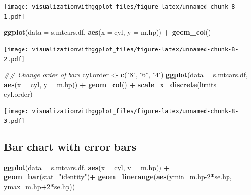 \documentclass[]{krantz}
\makeatletter
\newenvironment{Shaded}{\begin{snugshade}}{\end{snugshade}}
\newcommand{\CommentTok}[1]{\textcolor[rgb]{0.56,0.35,0.01}{\textit{#1}}}
\newcommand{\DataTypeTok}[1]{\textcolor[rgb]{0.13,0.29,0.53}{#1}}
\newcommand{\DecValTok}[1]{\textcolor[rgb]{0.00,0.00,0.81}{#1}}
\newcommand{\KeywordTok}[1]{\textcolor[rgb]{0.13,0.29,0.53}{\textbf{#1}}}
\newcommand{\NormalTok}[1]{#1}
\newcommand{\OperatorTok}[1]{\textcolor[rgb]{0.81,0.36,0.00}{\textbf{#1}}}
\newcommand{\StringTok}[1]{\textcolor[rgb]{0.31,0.60,0.02}{#1}}
\newenvironment{kframe}{%
\medskip{}
\setlength{\fboxsep}{.8em}
 \def\at@end@of@kframe{}%
 \ifinner\ifhmode%
  \def\at@end@of@kframe{\end{minipage}}%
  \begin{minipage}{\columnwidth}%
 \fi\fi%
 \def\FrameCommand##1{\hskip\@totalleftmargin \hskip-\fboxsep
 \colorbox{shadecolor}{##1}\hskip-\fboxsep
     \hskip-\linewidth \hskip-\@totalleftmargin \hskip\columnwidth}%
 \MakeFramed {\advance\hsize-\width
   \@totalleftmargin\z@ \linewidth\hsize
   \@setminipage}}%
 {\par\unskip\endMakeFramed%
 \at@end@of@kframe}
\renewenvironment{Shaded}{\begin{kframe}}{\end{kframe}}
\makeatother
\begin{document}
\texttt{[image: visualizationwithggplot\_files/figure-latex/unnamed-chunk-8-1.pdf]}

\begin{Shaded}
\begin{Highlighting}[]
\KeywordTok{ggplot}\NormalTok{(}\DataTypeTok{data =}\NormalTok{ s.mtcars.df, }\KeywordTok{aes}\NormalTok{(}\DataTypeTok{x =}\NormalTok{ cyl, }\DataTypeTok{y =}\NormalTok{ m.hp)) }\OperatorTok{+}
\StringTok{  }\KeywordTok{geom_col}\NormalTok{()}
\end{Highlighting}
\end{Shaded}

\texttt{[image: visualizationwithggplot\_files/figure-latex/unnamed-chunk-8-2.pdf]}

\begin{Shaded}
\begin{Highlighting}[]
\CommentTok{## Change order of bars}
\NormalTok{cyl.order <-}\StringTok{ }\KeywordTok{c}\NormalTok{(}\StringTok{"8"}\NormalTok{, }\StringTok{"6"}\NormalTok{, }\StringTok{"4"}\NormalTok{)}
\KeywordTok{ggplot}\NormalTok{(}\DataTypeTok{data =}\NormalTok{ s.mtcars.df, }\KeywordTok{aes}\NormalTok{(}\DataTypeTok{x =}\NormalTok{ cyl, }\DataTypeTok{y =}\NormalTok{ m.hp)) }\OperatorTok{+}
\StringTok{  }\KeywordTok{geom_col}\NormalTok{() }\OperatorTok{+}
\StringTok{  }\KeywordTok{scale_x_discrete}\NormalTok{(}\DataTypeTok{limits =}\NormalTok{ cyl.order)}
\end{Highlighting}
\end{Shaded}

\texttt{[image: visualizationwithggplot\_files/figure-latex/unnamed-chunk-8-3.pdf]}

\hypertarget{bar-chart-with-error-bars}{%
\subsection{Bar chart with error bars}\label{bar-chart-with-error-bars}}

\begin{Shaded}
\begin{Highlighting}[]
\KeywordTok{ggplot}\NormalTok{(}\DataTypeTok{data =}\NormalTok{ s.mtcars.df, }\KeywordTok{aes}\NormalTok{(}\DataTypeTok{x =}\NormalTok{ cyl, }\DataTypeTok{y =}\NormalTok{ m.hp)) }\OperatorTok{+}
\StringTok{  }\KeywordTok{geom_bar}\NormalTok{(}\DataTypeTok{stat=}\StringTok{"identity"}\NormalTok{)}\OperatorTok{+}
\StringTok{  }\KeywordTok{geom_linerange}\NormalTok{(}\KeywordTok{aes}\NormalTok{(}\DataTypeTok{ymin=}\NormalTok{m.hp}\DecValTok{-2}\OperatorTok{*}\NormalTok{se.hp, }\DataTypeTok{ymax=}\NormalTok{m.hp}\OperatorTok{+}\DecValTok{2}\OperatorTok{*}\NormalTok{se.hp))}
\end{Highlighting}
\end{Shaded}
\end{document}
